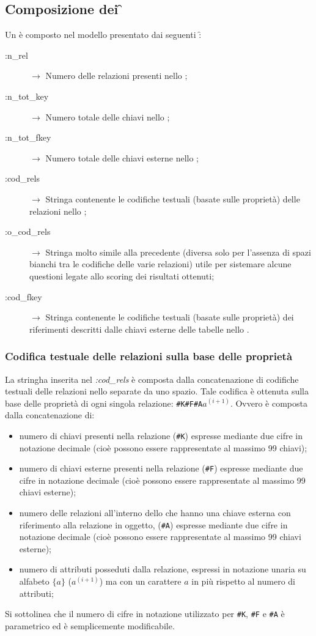 \subsection*{Composizione dei \f}
\noindent Un \doc è composto nel modello presentato dai seguenti \f:
\begin{description}
	\item[:n\_rel] $\rightarrow$ Numero delle relazioni presenti nello \se;
	\item[:n\_tot\_key] $\rightarrow$ Numero totale delle chiavi nello \se;
	\item[:n\_tot\_fkey] $\rightarrow$ Numero totale delle chiavi esterne nello \se;
	\item[:cod\_rels] $\rightarrow$ Stringa contenente le codifiche testuali (basate sulle proprietà) delle relazioni nello \se;
	\item[:o\_cod\_rels] $\rightarrow$ Stringa molto simile alla precedente (diversa solo per l'assenza di spazi bianchi tra le codifiche delle varie relazioni) utile per sistemare alcune questioni legate allo scoring dei risultati ottenuti;
	\item[:cod\_fkey] $\rightarrow$ Stringa contenente le codifiche testuali (basate sulle proprietà) dei riferimenti descritti dalle chiavi esterne delle tabelle nello \se.
\end{description}

\subsubsection*{Codifica testuale delle relazioni sulla base delle proprietà}
\noindent La stringha inserita nel \f {\em :cod\_rels} è composta dalla concatenazione di codifiche testuali delle relazioni nello \se separate da uno spazio. Tale codifica è ottenuta sulla base delle proprietà di ogni singola relazione: {\tt \#K\#F\#A$a^{(i+1)}$}. Ovvero è composta dalla concatenazione di:
\begin{itemize}
	\item numero di chiavi presenti nella relazione ({\tt \#K}) espresse mediante due cifre in notazione decimale (cioè possono essere rappresentate al massimo 99 chiavi);
	\item numero di chiavi  esterne presenti nella relazione ({\tt \#F}) espresse mediante due cifre in notazione decimale (cioè possono essere rappresentate al massimo 99 chiavi esterne);
	\item numero delle relazioni all'interno dello \se che hanno una chiave esterna con riferimento alla relazione in oggetto, ({\tt \#A}) espresse mediante due cifre in notazione decimale (cioè possono essere rappresentate al massimo 99 chiavi esterne);
	\item numero di attributi posseduti dalla relazione, espressi in notazione unaria su alfabeto $\{a\}$ ($a^{(i+1)}$) ma con un carattere $a$ in più rispetto al numero di attributi;
\end{itemize}
Si sottolinea che il numero di cifre in notazione utilizzato per {\tt \#K}, {\tt \#F} e {\tt \#A} è parametrico ed è semplicemente modificabile.

